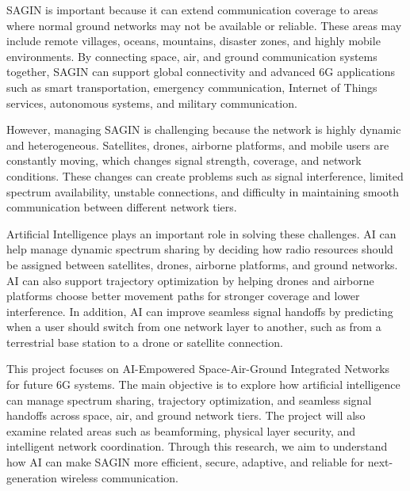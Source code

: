 \documentclass[letterpaper]{article} %
\begin{document}
SAGIN is important because it can extend communication coverage to areas where normal ground networks may not be available or reliable. These areas may include remote villages, oceans, mountains, disaster zones, and highly mobile environments. By connecting space, air, and ground communication systems together, SAGIN can support global connectivity and advanced 6G applications such as smart transportation, emergency communication, Internet of Things services, autonomous systems, and military communication.

However, managing SAGIN is challenging because the network is highly dynamic and heterogeneous. Satellites, drones, airborne platforms, and mobile users are constantly moving, which changes signal strength, coverage, and network conditions. These changes can create problems such as signal interference, limited spectrum availability, unstable connections, and difficulty in maintaining smooth communication between different network tiers.

Artificial Intelligence plays an important role in solving these challenges. AI can help manage dynamic spectrum sharing by deciding how radio resources should be assigned between satellites, drones, airborne platforms, and ground networks. AI can also support trajectory optimization by helping drones and airborne platforms choose better movement paths for stronger coverage and lower interference. In addition, AI can improve seamless signal handoffs by predicting when a user should switch from one network layer to another, such as from a terrestrial base station to a drone or satellite connection.

This project focuses on AI-Empowered Space-Air-Ground Integrated Networks for future 6G systems. The main objective is to explore how artificial intelligence can manage spectrum sharing, trajectory optimization, and seamless signal handoffs across space, air, and ground network tiers. The project will also examine related areas such as beamforming, physical layer security, and intelligent network coordination. Through this research, we aim to understand how AI can make SAGIN more efficient, secure, adaptive, and reliable for next-generation wireless communication.

\end{document}
